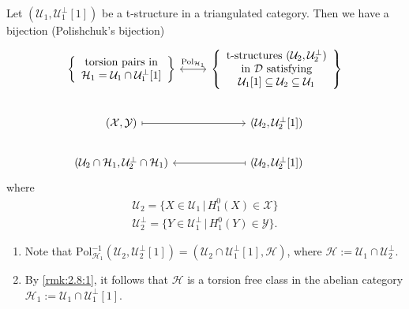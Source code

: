\begin{prop}[Polishchuk]\label{prop:2.7}
  Let $(\mathcal{U}_1,\mathcal{U}_1^\perp[1])$ be a t-structure in a triangulated category.
  Then we have a bijection (Polishchuk's bijection)
  \begin{equation*}
    \begin{tikzcd}
      \left\{
      \begin{array}{c}
        \text{torsion pairs in} \\
        \mathcal{H}_1=\mathcal{U}_1\cap \mathcal{U}_1^\perp[1]
      \end{array}
      \right\}
      \arrow[leftrightarrow]{r}{\mathrm{Pol}_{\mathcal{H}_1}}
        &
        \left\{
          \begin{array}{c}
            \text{t-structures }
            (\mathcal{U}_2,\mathcal{U}_2^\perp) \\
            \text{ in } \mathcal{D}
            \text{ satisfying } \\ \mathcal{U}_1[1]\subseteq \mathcal{U}_2\subseteq\mathcal{U}_1
          \end{array}
        \right\}\\
      (\mathcal{X},\mathcal{Y})\arrow[mapsto]{r}
        & (\mathcal{U}_2,\mathcal{U}_2^\perp[1])\\
      (\mathcal{U}_2\cap\mathcal{H}_1,\mathcal{U}_2^\perp\cap\mathcal{H}_1)\arrow[mapsfrom]{r}
        & (\mathcal{U}_2,\mathcal{U}_2^\perp[1])
    \end{tikzcd}
  \end{equation*}
  where
  \begin{align*}
    \mathcal{U}_2 = \{X\in\mathcal{U}_1\,|\,H^0_1(X)\in\mathcal{X}\}\\
    \mathcal{U}_2^\perp = \{Y\in\mathcal{U}_1^\perp\,|\,H^0_1(Y)\in\mathcal{Y}\}.
  \end{align*}
\end{prop}

\begin{rmk}\label{rmk:2.8}
  \begin{enumerate}[label=(\arabic*)]
    \item\label{rmk:2.8:1} Note that $\mathrm{Pol}^{-1}_{\mathcal{H}_1}(\mathcal{U}_2,\mathcal{U}^\perp_2[1])=
      (\mathcal{U}_2\cap\mathcal{U}_1^\perp[1],\mathcal{H})$, where
      $\mathcal{H}:=\mathcal{U}_1\cap\mathcal{U}_2^\perp$.

    \item By \ref{rmk:2.8:1}, it follows that $\mathcal{H}$ is a torsion free class in the abelian category
      $\mathcal{H}_1:=\mathcal{U}_1\cap\mathcal{U}_1^\perp[1]$.
  \end{enumerate}
\end{rmk}

